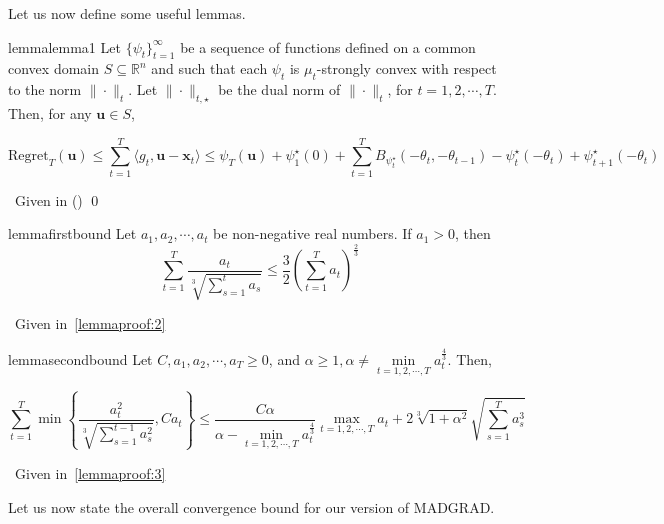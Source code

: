 \documentclass{article}
\newcommand{\R}{\mathbb{R}}
\newcommand{\Regret}{\text{Regret}}
\newcommand{\bx}{\mathbf{x}}
\newcommand{\bu}{\mathbf{u}}
\begin{document}
Let us now define some useful lemmas.

\begin{restatable}{lemma}{lemma1}\label{lemma:1}
  Let $\{\psi_t\}_{t=1}^\infty$ be a sequence of functions defined on a common convex domain $S \subseteq \R^n$ and
  such that each $\psi_t$ is $\mu_t$-strongly convex with respect to the norm $\|\cdot\|_t$. Let $\|\cdot\|_{t, \star}$ be
  the dual norm of $\| \cdot \|_t$, for $t = 1, 2, \cdots, T$. Then, for any $\bu \in S$,

  \[
    \Regret _T (\bu) \leq \sum\limits_{t=1}^T \langle g_t, \bu - \bx_t \rangle \leq \psi_{T}(\bu) + \psi_{1}^\star (0) +
    \sum\limits_{t=1}^T B_{\psi_{t}^\star}(-\theta_t, -\theta_{t-1}) - \psi_{t}^\star (-\theta_t) +
    \psi_{t+1}^\star(-\theta_t)
  \]
\end{restatable}

\proof~Given in (\cite{orabona_generalized_2014})
\qed

\begin{restatable}{lemma}{firstbound}\label{lemma:2}
  Let $a_1, a_2, \cdots, a_t$ be non-negative real numbers. If $a_1 > 0$, then
  \[
    \sum\limits_{t=1}^T \frac{a_t}{\sqrt[3]{\sum\limits_{s=1}^t a_s}} \leq \frac{3}{2}\left(\sum\limits_{t=1}^T
    a_t\right)^\frac{2}{3}
  \]
\end{restatable}

\proof~Given in~\ref{lemmaproof:2}

\begin{restatable}{lemma}{secondbound}\label{lemma:3}
  Let $C, a_1, a_2, \cdots, a_T \geq 0$, and $\alpha \geq 1, \alpha \neq \min\limits_{t=1,2,\cdots,T}a_{t}^\frac{4}{3}$.
  Then,

  \[
    \sum\limits_{t=1}^T \min \left\{ \frac{a_{t}^2}{\sqrt[3]{\sum\limits_{s=1}^{t-1} a_{s}^2}}, C a_t\right\} \leq
    \frac{C \alpha}{\alpha - \min\limits_{t=1,2,\cdots,T}a_{t}^\frac{4}{3}} \max\limits_{t=1,2,\cdots,T} a_t
    + 2\sqrt[3]{1 + \alpha^2} \sqrt{\sum\limits_{s=1}^T a_{s}^3}
  \]
\end{restatable}

\proof~Given in~\ref{lemmaproof:3}

Let us now state the overall convergence bound for our version of MADGRAD.
\end{document}
